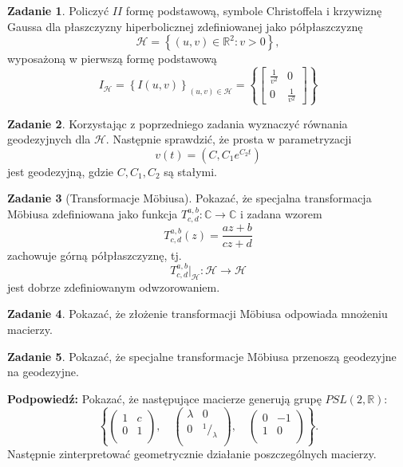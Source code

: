 \documentclass[a4paper,11pt]{article}
\theoremstyle{definition}\newtheorem{exercise}{Zadanie}
\theoremstyle{definition}\newtheorem{remark}{Uwaga}
\begin{document}
\begin{exercise}
 Policzyć $I\!I$ formę podstawową, symbole Christoffela i krzywiznę Gaussa dla 
płaszczyzny hiperbolicznej zdefiniowanej jako półpłaszczyznę 
\[\mathcal{H}=\left\{(u,v)\in \mathbb{R}^2\colon v>0 \right\},\] wyposażoną w 
pierwszą formę podstawową
\[I_{\mathcal{H}}=\left\{I(u,v)\right\}_{(u,v)\in 
\mathcal{H}}=\left\{\left[
\begin{array}{cc}
\frac{1}{v^2}&0\\
0 & \frac{1}{v^2}
\end{array}
\right]\right\}
\]

\end{exercise}

\begin{exercise}
 Korzystając z poprzedniego zadania wyznaczyć r\'ownania geodezyjnych dla 
$\mathcal{H}$. Następnie sprawdzić, że prosta w parametryzacji 
\[v(t)=(C,C_1 e^{C_2 t})\] jest geodezyjną, gdzie $C, C_{1} , C_2$ są stałymi.
\end{exercise}


\begin{exercise}[Transformacje M\"obiusa]
Pokazać, że specjalna transformacja M\"obiusa zdefiniowana jako funkcja
$T^{a,b}_{c,d}\colon \mathbb{C}\to\mathbb{C}$ i zadana wzorem
\[T^{a,b}_{c,d}(z)= \frac{az+b}{cz+d}\]
zachowuje g\'orną p\'ołpłaszczyznę, tj.
\[T^{a,b}_{c,d}\Big|_{\mathcal{H}}\colon \mathcal{H}\to \mathcal{H}\]
jest dobrze zdefiniowanym odwzorowaniem.
\end{exercise}

\begin{exercise}
Pokazać, że złożenie transformacji M\"obiusa odpowiada mnożeniu macierzy.
\end{exercise}


\begin{exercise}
Pokazać, że specjalne transformacje M\"obiusa przenoszą geodezyjne na 
geodezyjne. 

\small{\textbf{Podpowiedź:} Pokazać, że następujące macierze 
generują grupę $PSL(2,\mathbb{R})$: 
\[\left\{\left(\begin{array}{cc}
     1 & c\\
	0 & 1\\
     \end{array}
\right),\quad \left(\begin{array}{cc}
     \lambda & 0\\
	0 & ^1\!\!\big/_{\!\!\lambda}\\
     \end{array}
\right),\quad\left(\begin{array}{cc}
     0& -1\\
	1 & 0\\
     \end{array}
\right)\right\}.\]
Następnie zinterpretować geometrycznie działanie poszczególnych macierzy.}
\end{exercise}
\end{document}
